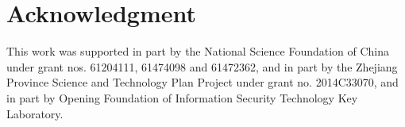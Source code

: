 \documentclass[journal]{IEEEtran}
\begin{document}


\section*{Acknowledgment}


This work was supported in part by the National Science Foundation of China under grant nos. 61204111, 61474098 and 61472362, and in part by the Zhejiang Province Science and Technology Plan Project under grant no. 2014C33070, and in part by Opening Foundation of Information Security Technology Key Laboratory.










\end{document}
